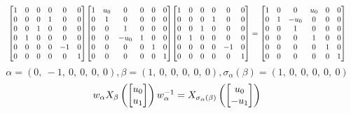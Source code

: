 \documentclass[11pt]{article}
\theoremstyle{definition}
\begin{document}
\[
\scaletoalign{\textwidth}{{\left[\begin{matrix}1 & 0 & 0 & 0 & 0 & 0\\0 & 0 & 0 & 1 & 0 & 0\\0 & 0 & 1 & 0 & 0 & 0\\0 & 1 & 0 & 0 & 0 & 0\\0 & 0 & 0 & 0 & -1 & 0\\0 & 0 & 0 & 0 & 0 & 1\end{matrix}\right]} {\left[\begin{matrix}1 & u_{0} & 0 & 0 & 0 & 0\\0 & 1 & 0 & 0 & 0 & 0\\0 & 0 & 1 & 0 & 0 & 0\\0 & 0 & - u_{0} & 1 & 0 & 0\\0 & 0 & 0 & 0 & 1 & 0\\0 & 0 & 0 & 0 & 0 & 1\end{matrix}\right]} {\left[\begin{matrix}1 & 0 & 0 & 0 & 0 & 0\\0 & 0 & 0 & 1 & 0 & 0\\0 & 0 & 1 & 0 & 0 & 0\\0 & 1 & 0 & 0 & 0 & 0\\0 & 0 & 0 & 0 & -1 & 0\\0 & 0 & 0 & 0 & 0 & 1\end{matrix}\right]} = {\left[\begin{matrix}1 & 0 & 0 & u_{0} & 0 & 0\\0 & 1 & - u_{0} & 0 & 0 & 0\\0 & 0 & 1 & 0 & 0 & 0\\0 & 0 & 0 & 1 & 0 & 0\\0 & 0 & 0 & 0 & 1 & 0\\0 & 0 & 0 & 0 & 0 & 1\end{matrix}\right]}}
\]
\[
\alpha = \left( 0, \  -1, \  0, \  0, \  0, \  0\right), \beta = \left( 1, \  0, \  0, \  0, \  0, \  0\right), \sigma_{\alpha}(\beta) = \left( 1, \  0, \  0, \  0, \  0, \  0\right)
\]
\[
\scaletoalign{\textwidth}{w_{\alpha} X_{\beta}\left(\left[\begin{matrix}u_{0}\\u_{1}\end{matrix}\right]\right) w_{\alpha}^{-1} = X_{\sigma_{\alpha}\left(\beta\right)}\left(\left[\begin{matrix}u_{0}\\- u_{1}\end{matrix}\right]\right)}
\]
\end{document}
